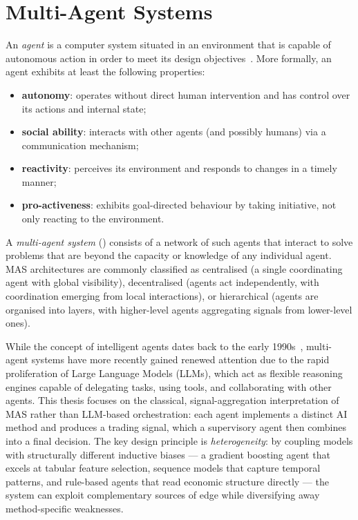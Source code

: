 \section{Multi-Agent Systems}

An \textit{agent} is a computer system situated in an environment that is capable of autonomous action in order to meet its design objectives~\cite{wooldridge1995intelligent}. More formally, an agent exhibits at least the following properties:
\begin{itemize}
    \item \textbf{autonomy}: operates without direct human intervention and has control over its actions and internal state;
    \item \textbf{social ability}: interacts with other agents (and possibly humans) via a communication mechanism;
    \item \textbf{reactivity}: perceives its environment and responds to changes in a timely manner;
    \item \textbf{pro-activeness}: exhibits goal-directed behaviour by taking initiative, not only reacting to the environment.
\end{itemize}

A \textit{multi-agent system} () consists of a network of such agents that interact to solve problems that are beyond the capacity or knowledge of any individual agent. MAS architectures are commonly classified as centralised (a single coordinating agent with global visibility), decentralised (agents act independently, with coordination emerging from local interactions), or hierarchical (agents are organised into layers, with higher-level agents aggregating signals from lower-level ones).


While the concept of intelligent agents dates back to the early 1990s~\cite{wooldridge1995intelligent}, multi-agent systems have more recently gained renewed attention due to the rapid proliferation of Large Language Models (LLMs), which act as flexible reasoning engines capable of delegating tasks, using tools, and collaborating with other agents. This thesis focuses on the classical, signal-aggregation interpretation of MAS rather than LLM-based orchestration: each agent implements a distinct AI method and produces a trading signal, which a supervisory agent then combines into a final decision. The key design principle is \textit{heterogeneity}: by coupling models with structurally different inductive biases --- a gradient boosting agent that excels at tabular feature selection, sequence models that capture temporal patterns, and rule-based agents that read economic structure directly --- the system can exploit complementary sources of edge while diversifying away method-specific weaknesses.

